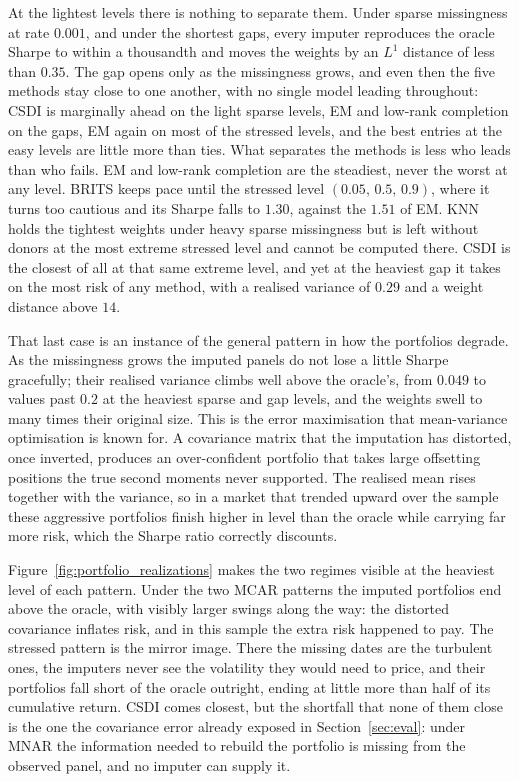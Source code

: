 At the lightest levels there is nothing to separate them. Under sparse
missingness at rate $0.001$, and under the shortest gaps, every imputer
reproduces the oracle Sharpe to within a thousandth and moves the weights by an
$L^1$ distance of less than $0.35$. The gap opens only as the missingness grows,
and even then the five methods stay close to one another, with no single model
leading throughout: CSDI is marginally ahead on the light sparse levels, EM and
low-rank completion on the gaps, EM again on most of the stressed levels, and
the best entries at the easy levels are little more than ties. What separates
the methods is less who leads than who fails. EM and low-rank completion are the
steadiest, never the worst at any level. BRITS keeps pace until the stressed
level $(0.05,\,0.5,\,0.9)$, where it turns too cautious and its Sharpe falls to
$1.30$, against the $1.51$ of EM. KNN holds the tightest weights under heavy
sparse missingness but is left without donors at the most extreme stressed level
and cannot be computed there. CSDI is the closest of all at that same extreme
level, and yet at the heaviest gap it takes on the most risk of any method, with
a realised variance of $0.29$ and a weight distance above $14$.

That last case is an instance of the general pattern in how the portfolios
degrade. As the missingness grows the imputed panels do not lose a little Sharpe
gracefully; their realised variance climbs well above the oracle's, from $0.049$
to values past $0.2$ at the heaviest sparse and gap levels, and the weights swell
to many times their original size. This is the error maximisation that
mean-variance optimisation is known for. A covariance matrix that the imputation
has distorted, once inverted, produces an over-confident portfolio that takes
large offsetting positions the true second moments never supported. The realised
mean rises together with the variance, so in a market that trended upward over
the sample these aggressive portfolios finish higher in level than the oracle
while carrying far more risk, which the Sharpe ratio correctly discounts.

Figure~\ref{fig:portfolio_realizations} makes the two regimes visible at the
heaviest level of each pattern. Under the two MCAR patterns the imputed
portfolios end above the oracle, with visibly larger swings along the way: the
distorted covariance inflates risk, and in this sample the extra risk happened
to pay. The stressed pattern is the mirror image. There the missing dates are
the turbulent ones, the imputers never see the volatility they would need to
price, and their portfolios fall short of the oracle outright, ending at little
more than half of its cumulative return. CSDI comes closest, but the shortfall
that none of them close is the one the covariance error already exposed in
Section~\ref{sec:eval}: under MNAR the information needed to rebuild the
portfolio is missing from the observed panel, and no imputer can supply it.

